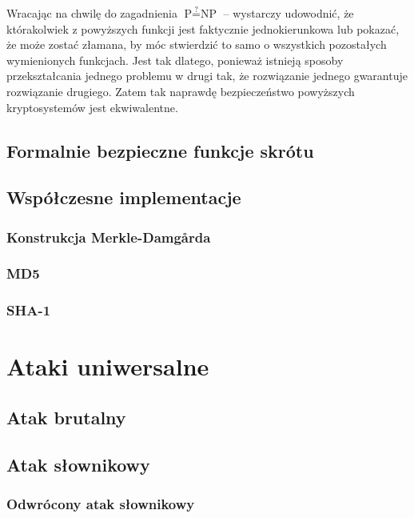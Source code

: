 \documentclass[12pt,a4paper,twoside]{article}
\begin{document}
Wracając na chwilę do zagadnienia $\textrm{P} \stackrel{?}{=} \textrm{NP}$ --
wystarczy udowodnić, że którakolwiek z powyższych funkcji jest faktycznie
jednokierunkowa lub pokazać, że może zostać złamana, by móc stwierdzić to samo
o wszystkich pozostałych wymienionych funkcjach. Jest tak dlatego, ponieważ
istnieją sposoby przekształcania jednego problemu w drugi tak, że rozwiązanie
jednego gwarantuje rozwiązanie drugiego. Zatem tak naprawdę bezpieczeństwo
powyższych kryptosystemów jest ekwiwalentne.

\subsection{Formalnie bezpieczne funkcje skrótu}

\newpage
\subsection{Współczesne implementacje}

\subsubsection{Konstrukcja Merkle-Damg\r{a}rda}

\subsubsection{MD5}

\subsubsection{SHA-1}

\section{Ataki uniwersalne}
\label{sec:universal_attacks}

\subsection{Atak brutalny}

\subsection{Atak słownikowy}

\subsubsection{Odwrócony atak słownikowy}
\end{document}
